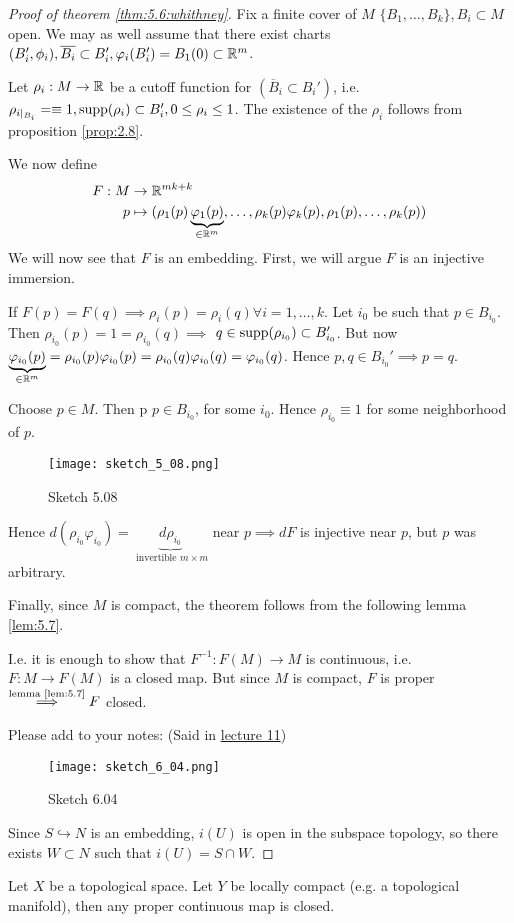 \begin{proof}[Proof of theorem \ref{thm:5.6:whithney}]
    Fix a finite cover of \(M\) \(\{B_1,\dots,B_k\},B_i\subset M\) open. We may as well assume 
    that there exist charts \((B_i',\phi_i),\overline{B_i}\subset B_i',\varphi_i(B_i')=B_1(0)\subset \mathbb{R}^m\).

    Let \(\rho_i:M\to \mathbb{R}\) be a cutoff function for \((\overline{B}_i\subset B_i')\), i.e. \(\rho_{i\mid_{B_i}}=\equiv 1,\text{supp} (\rho_i)\subset B_i',0\leq \rho_i\leq 1\).
    The existence of the \(\rho_i\) follows from proposition \ref{prop:2.8}. 

    We now define 
    \begin{align*}
        F:M&\to \mathbb{R}^{mk+k}\\
        p&\mapsto (\rho_1(p)\underbrace{\varphi_1(p)}_{\in \mathbb{R}^m},\dots,\rho_k(p)\varphi_k(p),\rho_1(p),\dots,\rho_k(p))
    \end{align*}
    We will now see that \(F\) is an embedding. First, we will argue \(F\) is an injective immersion.

    If \(F(p)=F(q)\implies \rho_i(p)=\rho_i(q)\forall i=1,\dots,k\). Let \(i_0\) be such that \(p\in B_{i_0}\). Then 
    \(\rho_{i_0}(p)=1=\rho_{i_0}(q)\implies\) \(q\in \text{supp}(\rho_{i_0})\subset B_{i_0}'\). But 
    now \(\underbrace{\varphi_{i_0}(p)}_{\in\mathbb{R}^m} = \rho_{i_0}(p)\varphi_{i_0}(p)=\rho_{i_0}(q)\varphi_{i_0}(q)=\varphi_{i_0}(q)\). Hence \(p,q\in B_{i_0}'\implies p=q\).

     Choose \(p\in M\). Then p \(p\in B_{i_0}\), for some 
    \(i_0\). Hence \(\rho_{i_0}\equiv 1\) for some neighborhood of \(p\).
    \begin{figure}[H]\label{fig:5.08}
        \centering
        \texttt{[image: sketch\_5\_08.png]}
        \caption{Sketch 5.08}
    \end{figure}
    Hence \(d(\rho_{i_0}\varphi_{i_0})=\underbrace{d\rho_{i_0}}_{\text{ invertible }m\times m}\) near \(p\implies dF\) is injective near \(p\), but \(p\) was arbitrary.

    Finally,
    since \(M\) is compact, the theorem follows from the following lemma \ref{lem:5.7}.

    I.e. it is enough to show that \(F^{-1}:F(M)\to M\) is continuous, i.e. 
    \(F:M\to F(M)\) is a closed map. But since \(M\) is compact, \(F\) is proper \(\stackrel{\text{lemma \ref{lem:5.7}}}{\implies} F\) closed.

    Please add to your notes: (Said in \hyperref[lec11]{lecture 11})

    \begin{figure}[H]
        \centering
        \texttt{[image: sketch\_6\_04.png]}
        \caption{Sketch 6.04}
    \end{figure}
    
    Since \(S\hookrightarrow N\) is an embedding, \(i(U)\) is open in the 
    subspace topology, so there exists \(W\subset N\) such that \(i(U)=S\cap W\).

\end{proof}


\begin{lemma}\label{lem:5.7}
    Let \(X\) be a topological space. Let \(Y\) be locally compact (e.g. a topological manifold),
    then any proper continuous map %
    is closed.
\end{lemma}